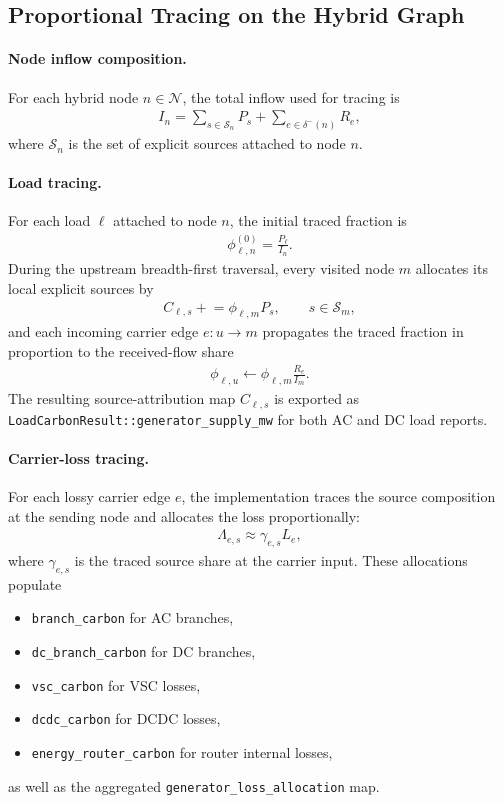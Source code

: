 \subsection{Proportional Tracing on the Hybrid Graph}

\paragraph{Node inflow composition.}
For each hybrid node \(n \in \mathcal{N}\), the total inflow used for tracing is
\begin{align}
I_n = \sum_{s \in \mathcal{S}_n} P_s + \sum_{e \in \delta^{-}(n)} R_e,
\end{align}
where \(\mathcal{S}_n\) is the set of explicit sources attached to node \(n\).

\paragraph{Load tracing.}
For each load \(\ell\) attached to node \(n\), the initial traced fraction is
\begin{align}
\phi_{\ell,n}^{(0)} = \frac{P_{\ell}}{I_n}.
\end{align}
During the upstream breadth-first traversal, every visited node \(m\) allocates
its local explicit sources by
\begin{align}
C_{\ell,s} \mathrel{+}= \phi_{\ell,m} P_s,
\qquad s \in \mathcal{S}_m,
\end{align}
and each incoming carrier edge \(e:u\rightarrow m\) propagates the traced
fraction in proportion to the received-flow share
\begin{align}
\phi_{\ell,u} \leftarrow \phi_{\ell,m} \frac{R_e}{I_m}.
\end{align}
The resulting source-attribution map \(C_{\ell,s}\) is exported as
\texttt{LoadCarbonResult::generator\_supply\_mw} for both AC and DC load
reports.

\paragraph{Carrier-loss tracing.}
For each lossy carrier edge \(e\), the implementation traces the source
composition at the sending node and allocates the loss proportionally:
\begin{align}
\Lambda_{e,s} \approx \gamma_{e,s} L_e,
\end{align}
where \(\gamma_{e,s}\) is the traced source share at the carrier input.  These
allocations populate
\begin{itemize}
  \item \texttt{branch\_carbon} for AC branches,
  \item \texttt{dc\_branch\_carbon} for DC branches,
  \item \texttt{vsc\_carbon} for VSC losses,
  \item \texttt{dcdc\_carbon} for DCDC losses,
  \item \texttt{energy\_router\_carbon} for router internal losses,
\end{itemize}
as well as the aggregated \texttt{generator\_loss\_allocation} map.

